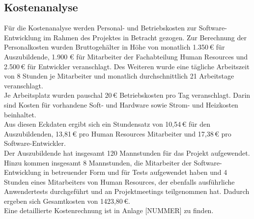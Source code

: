 \vfill
\pagebreak

\subsection{Kostenanalyse}
    Für die Kostenanalyse werden Personal- und Betriebskosten zur Software-Entwicklung im Rahmen des Projektes in Betracht gezogen. Zur Berechnung der Personalkosten wurden Bruttogehälter in Höhe von monatlich 1.350\,€ für Auszubildende, 1.900 € für Mitarbeiter der Fachabteilung Human Resources und 2.500\,€ für Entwickler veranschlagt. Des Weiteren wurde eine tägliche Arbeitszeit von 8 Stunden je Mitarbeiter und monatlich durchschnittlich 21 Arbeitstage veranschlagt.\\
    Je Arbeitsplatz wurden pauschal 20\,€ Betriebskosten pro Tag veranschlagt. Darin sind Kosten für vorhandene Soft- und Hardware sowie Strom- und Heizkosten beinhaltet.\\
    Aus diesen Eckdaten ergibt sich ein Stundensatz von 10,54\,€ für den Auszubildenden, 13,81\,€ pro Human Resources Mitarbeiter und 17,38\,€ pro Software-Entwickler.\\
    Der Auszubildende hat insgesamt 120 Mannstunden für das Projekt aufgewendet. Hinzu kommen insgesamt 8 Mannstunden, die Mitarbeiter der Software-Entwicklung in betreuender Form und für Tests aufgewendet haben und 4 Stunden eines Mitarbeiters von Human Resources, der ebenfalls ausführliche Anwendertests durchgeführt und an Projektmeetings teilgenommen hat. Dadurch ergeben sich Gesamtkosten von 1423,80\,€.\\
    Eine detaillierte Kostenrechnung ist in Anlage [NUMMER] zu finden.

